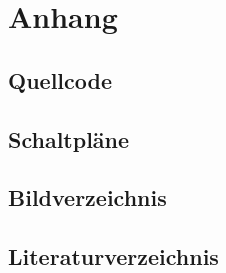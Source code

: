 \chapter{Anhang}

\section{Quellcode}

\section{Schaltpläne}

\section{Bildverzeichnis}
\listoffigures %

\section{Literaturverzeichnis}
\printbibliography %